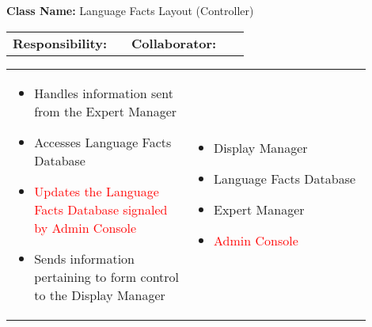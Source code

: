 \begin{cards}[]
    \textbf{Class Name:} Language Facts Layout (Controller)
    \tcbline
    \begin{tabular}{p{0.45\linewidth} | p{0.45\linewidth}}
        \textbf{Responsibility:}& 
        \textbf{Collaborator:}\\
    \end{tabular}
    \tcbline
    \begin{tabular}{p{0.45\linewidth} | p{0.45\linewidth}}
        \begin{itemize}
            \item Handles information sent from the Expert Manager
            \item Accesses Language Facts Database
            \item \textcolor{red}{Updates the Language Facts Database signaled by Admin Console}
            \item Sends information pertaining to form control to the Display Manager
             
        \end{itemize}
        &
        \begin{itemize}
            \item Display Manager
            \item Language Facts Database
            \item Expert Manager
            \item \textcolor{red}{Admin Console}
            
        \end{itemize}
    \end{tabular}
\end{cards}